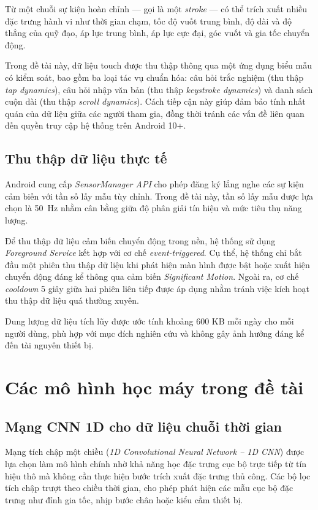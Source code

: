 \documentclass[../DoAn.tex]{subfiles}
\begin{document}
    Từ một chuỗi sự kiện hoàn chỉnh --- gọi là một \textit{stroke} --- có thể trích xuất nhiều đặc trưng hành vi như thời gian chạm, tốc độ vuốt trung bình, độ dài và độ thẳng của quỹ đạo, áp lực trung bình, áp lực cực đại, góc vuốt và gia tốc chuyển động.
    
    Trong đề tài này, dữ liệu touch được thu thập thông qua một ứng dụng biểu mẫu có kiểm soát, bao gồm ba loại tác vụ chuẩn hóa: câu hỏi trắc nghiệm (thu thập \textit{tap dynamics}), câu hỏi nhập văn bản (thu thập \textit{keystroke dynamics}) và danh sách cuộn dài (thu thập \textit{scroll dynamics}). Cách tiếp cận này giúp đảm bảo tính nhất quán của dữ liệu giữa các người tham gia, đồng thời tránh các vấn đề liên quan đến quyền truy cập hệ thống trên Android 10+.

    \subsection{Thu thập dữ liệu thực tế}

    Android cung cấp \textit{SensorManager API} cho phép đăng ký lắng nghe các sự kiện cảm biến với tần số lấy mẫu tùy chỉnh. Trong đề tài này, tần số lấy mẫu được lựa chọn là 50~Hz nhằm cân bằng giữa độ phân giải tín hiệu và mức tiêu thụ năng lượng.
    
    Để thu thập dữ liệu cảm biến chuyển động trong nền, hệ thống sử dụng \textit{Foreground Service} kết hợp với cơ chế \textit{event-triggered}. Cụ thể, hệ thống chỉ bắt đầu một phiên thu thập dữ liệu khi phát hiện màn hình được bật hoặc xuất hiện chuyển động đáng kể thông qua cảm biến \textit{Significant Motion}. Ngoài ra, cơ chế \textit{cooldown} 5 giây giữa hai phiên liên tiếp được áp dụng nhằm tránh việc kích hoạt thu thập dữ liệu quá thường xuyên.
    
    Dung lượng dữ liệu tích lũy được ước tính khoảng 600 KB mỗi ngày cho mỗi người dùng, phù hợp với mục đích nghiên cứu và không gây ảnh hưởng đáng kể đến tài nguyên thiết bị.

    \section{Các mô hình học máy trong đề tài}

    \subsection{Mạng CNN 1D cho dữ liệu chuỗi thời gian}
    
    Mạng tích chập một chiều (\textit{1D Convolutional Neural Network -- 1D CNN}) được lựa chọn làm mô hình chính nhờ khả năng học đặc trưng cục bộ trực tiếp từ tín hiệu thô mà không cần thực hiện bước trích xuất đặc trưng thủ công. Các bộ lọc tích chập trượt theo chiều thời gian, cho phép phát hiện các mẫu cục bộ đặc trưng như đỉnh gia tốc, nhịp bước chân hoặc kiểu cầm thiết bị.
    
\end{document}
